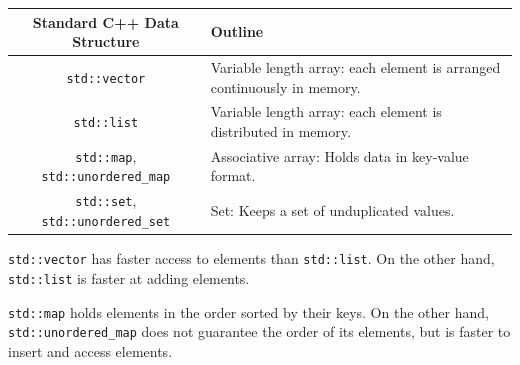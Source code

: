 \documentclass[
]{book}
\begin{document}
\begin{longtable}[]{@{}cl@{}}
\toprule
\begin{minipage}[b]{0.40\columnwidth}\centering
Standard C++ Data Structure\strut
\end{minipage} & \begin{minipage}[b]{0.54\columnwidth}\raggedright
Outline\strut
\end{minipage}\tabularnewline
\midrule
\endhead
\begin{minipage}[t]{0.40\columnwidth}\centering
\texttt{std::vector}\strut
\end{minipage} & \begin{minipage}[t]{0.54\columnwidth}\raggedright
Variable length array: each element is arranged continuously in memory.\strut
\end{minipage}\tabularnewline
\begin{minipage}[t]{0.40\columnwidth}\centering
\texttt{std::list}\strut
\end{minipage} & \begin{minipage}[t]{0.54\columnwidth}\raggedright
Variable length array: each element is distributed in memory.\strut
\end{minipage}\tabularnewline
\begin{minipage}[t]{0.40\columnwidth}\centering
\texttt{std::map}, \texttt{std::unordered\_map}\strut
\end{minipage} & \begin{minipage}[t]{0.54\columnwidth}\raggedright
Associative array: Holds data in key-value format.\strut
\end{minipage}\tabularnewline
\begin{minipage}[t]{0.40\columnwidth}\centering
\texttt{std::set}, \texttt{std::unordered\_set}\strut
\end{minipage} & \begin{minipage}[t]{0.54\columnwidth}\raggedright
Set: Keeps a set of unduplicated values.\strut
\end{minipage}\tabularnewline
\bottomrule
\end{longtable}

\texttt{std::vector} has faster access to elements than \texttt{std::list}. On the other hand, \texttt{std::list} is faster at adding elements.

\texttt{std::map} holds elements in the order sorted by their keys. On the other hand, \texttt{std::unordered\_map} does not guarantee the order of its elements, but is faster to insert and access elements.
\end{document}
